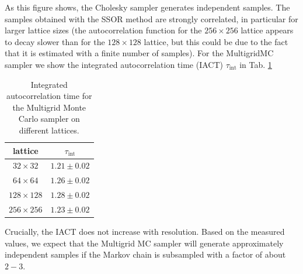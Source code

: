 \documentclass[11pt]{article}
\begin{document}
As this figure shows, the Cholesky sampler generates independent samples. The samples obtained with the SSOR method are strongly correlated, in particular for larger lattice sizes (the autocorrelation function for the $256\times 256$ lattice appears to decay slower than for the $128\times 128$ lattice, but this could be due to the fact that it is estimated with a finite number of samples). For the MultigridMC sampler we show the integrated autocorrelation time (IACT) $\tau_{\text{int}}$ in Tab. \ref{tab:tau_int}
\begin{table}
    \begin{center}
        \begin{tabular}{cc}
            \hline
            lattice         & $\tau_{\text{int}}$ \\
            \hline\hline
            $32 \times 32$  & $1.21 \pm  0.02$    \\
            $64\times 64$   & $1.26 \pm 0.02$     \\
            $128\times 128$ & $1.28 \pm  0.02$    \\
            $256\times256$  & $1.23 \pm  0.02$    \\
            \hline
        \end{tabular}
        \caption{Integrated autocorrelation time for the Multigrid Monte Carlo sampler on different lattices.}
        \label{tab:tau_int}
    \end{center}
\end{table}
Crucially, the IACT does not increase with resolution. Based on the measured values, we expect that the Multigrid MC sampler will generate approximately independent samples if the Markov chain is subsampled with a factor of about $2-3$.
\end{document}
